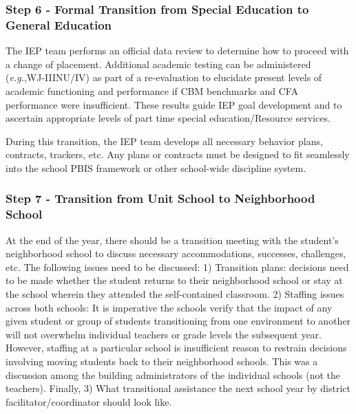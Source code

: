 \documentclass[twoside]{article}
\begin{document}
\subsubsection{Step 6 - Formal Transition from Special Education to General Education}
The IEP team performs an official data review to determine how to proceed with a change of placement. Additional academic testing can be administered (\textit{e.g.},WJ-IIINU/IV) as part of a re-evaluation to elucidate present levels of academic functioning and performance if CBM benchmarks and CFA performance were insufficient. These results guide IEP goal development and to ascertain appropriate levels of part time special education/Resource services.

During this transition, the IEP team develops all necessary behavior plans, contracts, trackers, etc. Any plans or contracts must be designed to fit seamlessly into the school PBIS framework or other school-wide discipline system.

\subsubsection{Step 7 - Transition from Unit School to Neighborhood School}
At the end of the year, there should be a transition meeting with the student's neighborhood school to discuss necessary accommodations, successes, challenges, etc. The following issues need to be discussed: 1) Transition plans: decisions need to be made whether the student returns to their neighborhood school or stay at the school wherein they attended the self-contained classroom. 2) Staffing issues across both schools: It is imperative the schools verify that the impact of any given student or group of students transitioning from one environment to another will not overwhelm individual teachers or grade levels the subsequent year. However, staffing at a particular school is insufficient reason to restrain decisions involving moving students back to their neighborhood schools. This was a discussion among the building administrators of the individual schools (not the teachers). Finally, 3) What transitional assistance the next school year by district facilitator/coordinator should look like.
\end{document}
